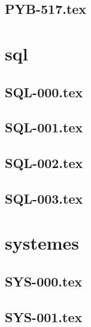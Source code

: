 \renewcommand{\xxexo}{PYB-517.tex} 
\subsection*{\xxexo} 
\graphicspath{{../../exos/python_bases/PYB-517/}}
 
 
\section*{sql}
\renewcommand{\xxexo}{SQL-000.tex} 
\subsection*{\xxexo} 
\graphicspath{{../../exos/sql/SQL-000/}}
 
 
\renewcommand{\xxexo}{SQL-001.tex} 
\subsection*{\xxexo} 
\graphicspath{{../../exos/sql/SQL-001/}}
 
 
\renewcommand{\xxexo}{SQL-002.tex} 
\subsection*{\xxexo} 
\graphicspath{{../../exos/sql/SQL-002/}}
 
 
\renewcommand{\xxexo}{SQL-003.tex} 
\subsection*{\xxexo} 
\graphicspath{{../../exos/sql/SQL-003/}}
 
 
\section*{systemes}
\renewcommand{\xxexo}{SYS-000.tex} 
\subsection*{\xxexo} 
\graphicspath{{../../exos/systemes/SYS-000/}}
 
 
\renewcommand{\xxexo}{SYS-001.tex} 
\subsection*{\xxexo} 
\graphicspath{{../../exos/systemes/SYS-001/}}
 
 
